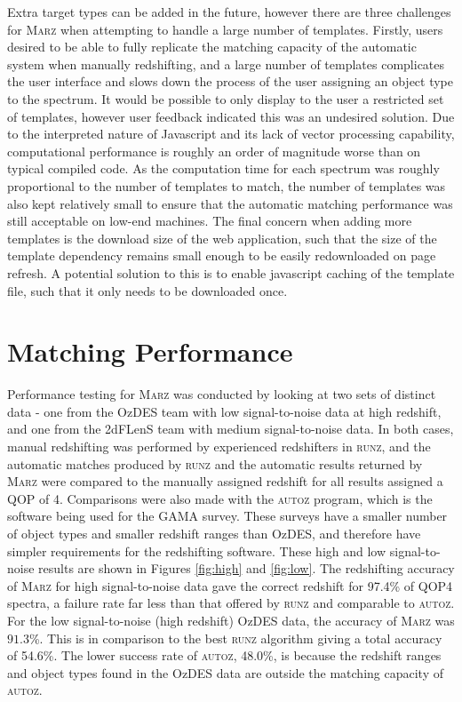 \documentclass[5p]{elsarticle}
\newcommand{\runz}{\textsc{runz}}
\newcommand{\autoz}{\textsc{autoz}}
\newcommand{\marz}{\textsc{Marz}}
\begin{document}
Extra target types can be added in the future, however there are three challenges for \marz{} when attempting to handle a large number of templates. Firstly, users desired to be able to fully replicate the matching capacity of the automatic system when manually redshifting, and a large number of templates complicates the user interface and slows down the process of the user assigning an object type to the spectrum. It would be possible to only display to the user a restricted set of templates, however user feedback indicated this was an undesired solution. Due to the interpreted nature of Javascript and its lack of vector processing capability, computational performance is roughly an order of magnitude worse than on typical compiled code. As the computation time for each spectrum was roughly proportional to the number of templates to match, the number of templates was also kept relatively small to ensure that the automatic matching performance was still acceptable on low-end machines. The final concern when adding more templates is the download size of the web application, such that the size of the template dependency remains small enough to be easily redownloaded on page refresh. A potential solution to this is to enable javascript caching of the template file, such that it only needs to be downloaded once.













\section{Matching Performance} \label{sec:perf}

Performance testing for \marz{} was conducted by looking at two sets of distinct data - one from the OzDES team with low signal-to-noise data at high redshift, and one from the 2dFLenS team with medium signal-to-noise data. In both cases, manual redshifting was performed by experienced redshifters in \runz{}, and the automatic matches produced by \runz{} and the automatic results returned by \marz{} were compared to the manually assigned redshift for all results assigned a QOP of 4. Comparisons were also made with the \autoz{} program, which is the software being used for the GAMA survey. These surveys have a smaller number of object types and smaller redshift ranges than OzDES, and therefore have simpler requirements for the redshifting software. These high and low signal-to-noise results are shown in Figures \ref{fig:high} and \ref{fig:low}. The redshifting accuracy of \marz{} for high signal-to-noise data gave the correct redshift for 97.4\% of QOP4 spectra, a failure rate far less than that offered by \runz{} and comparable to \autoz{}. For the low signal-to-noise (high redshift) OzDES data, the accuracy of \marz{} was $91.3$\%. This is in comparison to the best \runz{} algorithm giving a total accuracy of 54.6\%. The lower success rate of \autoz, 48.0\%, is because the redshift ranges and object types found in the OzDES data are outside the matching capacity of \autoz{}.
\end{document}
